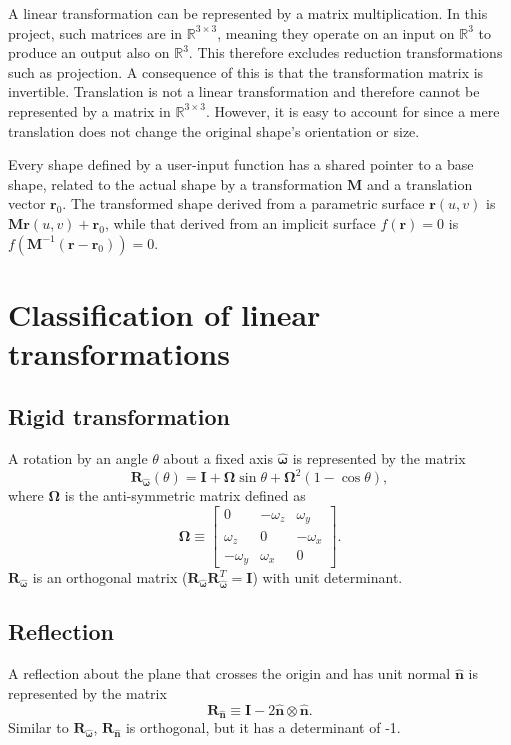 A linear transformation can be represented by a matrix multiplication. In this project, such matrices are in $\mathbb{R}^{3\times3}$, meaning they operate on an input on $\mathbb{R}^3$ to produce an output also on
$\mathbb{R}^3$. This therefore excludes reduction transformations such as projection. A consequence of this is that the transformation matrix is invertible. Translation is not a linear transformation and therefore
cannot be represented by a matrix in $\mathbb{R}^{3\times3}$. However, it is easy to account for since a mere translation does not change the original shape's orientation or size.

Every shape defined by a user-input function has a shared pointer to a base shape, related to the actual shape by a transformation $\bm{M}$ and a translation vector $\bm{r}_0$. The transformed shape derived from a
parametric surface $\bm{r}(u,v)$ is $\bm{Mr}(u,v) + \bm{r}_0$, while that derived from an implicit surface $f(\bm{r}) = 0$ is $f(\bm{M}^{-1}(\bm{r} - \bm{r}_0)) = 0$.


\section{Classification of linear transformations}
\subsection{Rigid transformation}
A rotation by an angle $\theta$ about a fixed axis $\bm{\hat{\omega}}$ is represented by the matrix
\begin{equation}
    \bm{R}_{\bm{\hat{\omega}}}(\theta) = \bm{I} + \bm{\Omega} \sin\theta + \bm{\Omega}^2 (1-\cos\theta),
\end{equation} 
where $\bm{\Omega}$ is the anti-symmetric matrix defined as
\begin{equation}
    \bm{\Omega} \equiv
    \begin{bmatrix}
        0 & -\omega_z & \omega_y \\
        \omega_z & 0 & -\omega_x \\
        -\omega_y & \omega_x & 0
    \end{bmatrix}.
\end{equation}
$\bm{R}_{\bm{\hat{\omega}}}$ is an orthogonal matrix ($\bm{R}_{\bm{\hat{\omega}}} \bm{R}_{\bm{\hat{\omega}}}^T = \bm{I}$) with unit determinant.

\subsection{Reflection}
A reflection about the plane that crosses the origin and has unit normal $\bm{\hat{n}}$ is represented by the matrix
\begin{equation}
    \bm{R}_{\bm{\hat{n}}} \equiv \bm{I} - 2\bm{\hat{n}} \otimes \bm{\hat{n}}.
\end{equation}
Similar to $\bm{R}_{\bm{\hat{\omega}}}$, $\bm{R}_{\bm{\hat{n}}}$ is orthogonal, but it has a determinant of -1.

